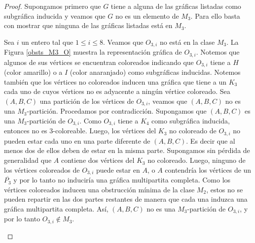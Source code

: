 \begin{proof}
Supongamos primero que $G$ tiene a alguna de las gráficas listadas como subgráfica inducida y veamos que $G$ no es un elemento de $M_3$. Para ello basta con mostrar que ninguna de las gráficas listadas está en $M_3$.

Sea $i$ un entero tal que $1\le i \le 8$. Veamos que $O_{3,i}$ no está en la clase $M_3$. La Figura \ref{obsts_M3_O} muestra la representación gráfica de $O_{3,i}$. Notemos que algunos de sus vértices se encuentran coloreados indicando que $O_{3,i}$ tiene a $H$ (color amarillo) o a $I$ (color anaranjado) como subgráficas inducidas. Notemos también que los vértices no coloreados inducen una gráfica que tiene a un $K_3$ cada uno de cuyos vértices no es adyacente a ningún vértice coloreado. Sea $(A,B,C)$ una partición de los vértices de $O_{3,i}$, veamos que $(A,B,C)$ no es una $M_3$-partición. Procedamos por contradicción. Supongamos que $(A,B,C)$ es una $M_3$-partición de $O_{3,i}$. Como $O_{3,i}$ tiene a $K_4$ como subgráfica inducida, entonces no es 3-coloreable. Luego, los vértices del $K_3$ no coloreado de $O_{3,i}$ no pueden estar cada uno en una parte diferente de $(A,B,C)$. Es decir que al menos dos de ellos deben de estar en la misma parte. Supongamos sin pérdida de generalidad que $A$ contiene dos vértices del $K_3$ no coloreado. Luego, ninguno de los vértices coloreados de $O_{3,i}$ puede estar en $A$, o $A$ contendría los vértices de un $\overline{P_3}$ y por lo tanto no induciría una gráfica multipartita completa. Como los vértices coloreados inducen una obstrucción mínima de la clase $M_2$, estos no se pueden repartir en las dos partes
restantes de manera que cada una induzca una gráfica multipartita completa. Así, $(A,B,C)$ no es una $M_3$-partición de $O_{3,i}$, y por lo tanto $O_{3,i}\notin M_3$.

\begin{figure}[ht!]
\begin{subfigure}{\textwidth}
\begin{center}
\end{center}
\end{subfigure}
\end{figure}
\end{proof}
